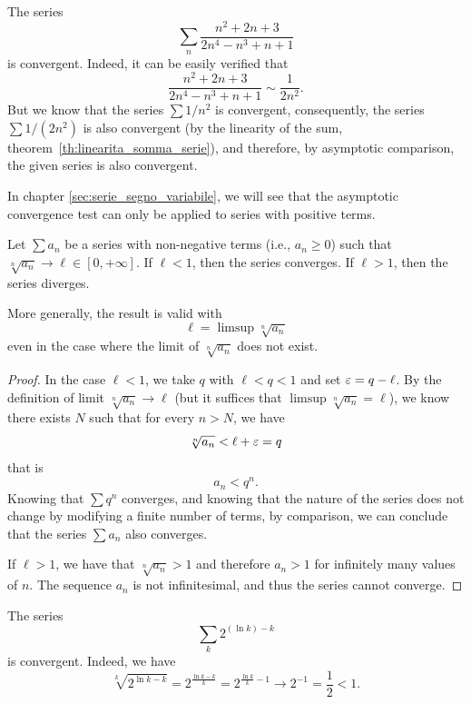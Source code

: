 \begin{example}
The series
\[
\sum_n \frac{n^2+2n+3}{2n^4-n^3+n+1}
\]
is convergent. Indeed, it can be easily verified that
\[
   \frac{n^2+2n+3}{2n^4-n^3+n+1} \sim \frac{1}{2n^2}.
\]
But we know that the series $\sum 1/n^2$ is convergent, consequently, the series
$\sum 1/(2n^2)$ is also convergent (by the linearity of the sum,
theorem~\ref{th:linearita_somma_serie}), and therefore, by asymptotic
comparison, the given series is also convergent.
\end{example}

In chapter \ref{sec:serie_segno_variabile}, we will see that the asymptotic
convergence test can only be applied to series with positive terms.

\begin{theorem}
Let $\sum a_n$ be a series with non-negative terms (i.e., $a_n\ge 0$) such that
\mymark{***}
$\sqrt[n]{a_n} \to \ell \in [0,+\infty]$.
If $\ell<1$, then the series converges.
If $\ell>1$, then the series diverges.

More generally, the result is valid with
\[
  \ell = \limsup \sqrt[n]{a_n}
\]
even in the case where the limit of $\sqrt[n]{a_n}$ does not exist.
\end{theorem}
%
\begin{proof}
\mymark{***}
In the case $\ell < 1$, we take $q$ with $\ell < q < 1$ and set $\varepsilon = q-\ell$.
By the definition of limit $\sqrt[n]{a_n}\to \ell$ (but it suffices that
$\limsup \sqrt[n]{a_n}=\ell$), we know there exists $N$ such that for every $n >
N$, we have
\[
  \sqrt[n]{a_n} < \ell + \varepsilon = q
\]
that is
\[
   a_n < q^n.
\]
Knowing that $\sum q^n$ converges, and knowing that the nature of the series
does not change by modifying a finite number of terms, by comparison, we can
conclude that the series $\sum a_n$ also converges.

If $\ell>1$, we have that $\sqrt[n]{a_n}>1$ and therefore $a_n>1$ for infinitely
many values of $n$. The sequence $a_n$ is not infinitesimal, and thus the series
cannot converge.
\end{proof}

\begin{example}
The series
\[
  \sum_k 2^{(\ln k) - k}
\]
is convergent. Indeed, we have
\[
 \sqrt[k]{2^{\ln k - k}}
 = 2^{\frac{\ln k - k}{k}}
 = 2^{\frac{\ln k }k - 1}
 \to 2^{-1}
 = \frac{1}{2}
 < 1.
\]
\end{example}

